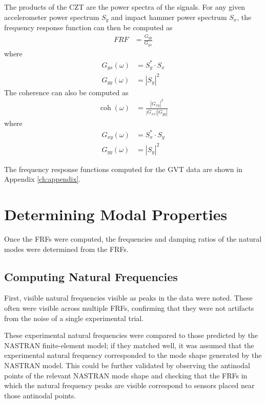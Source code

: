 The products of the CZT are the power spectra of the signals. For any given accelerometer power spectrum $S_y$ and impact hammer power spectrum $S_x$, the frequency response function can then be computed as
\begin{align}
    FRF &= \frac{G_{yy}}{G_{yx}}
\end{align}
where
\begin{align}
    G_{yx}(\omega) &= S_y^* \cdot S_x \\
    G_{yy}(\omega) &= |S_y|^2
\end{align}
The coherence can also be computed as
\begin{align}
    \operatorname{coh}(\omega) &= \frac{|G_{xy}|^2}{|G_{xx}||G_{yy}|}
\end{align}
where
\begin{align}
    G_{xy}(\omega) &= S_x^* \cdot S_y \\
    G_{yy}(\omega) &= |S_y|^2
\end{align}

The frequency response functions computed for the GVT data are shown in Appendix \ref{ch:appendix}.

\section{Determining Modal Properties} %

Once the FRFs were computed, the frequencies and damping ratios of the natural modes were determined from the FRFs.

\subsection{Computing Natural Frequencies}

First, visible natural frequencies visible as peaks in the data were noted. These often were visible across multiple FRFs, confirming that they were not artifacts from the noise of a single experimental trial.

These experimental natural frequencies were compared to those predicted by the NASTRAN finite-element model; if they matched well, it was assumed that the experimental natural frequency corresponded to the mode shape generated by the NASTRAN model. This could be further validated by observing the antinodal points of the relevant NASTRAN mode shape and checking that the FRFs in which the natural frequency peaks are visible correspond to sensors placed near those antinodal points.

